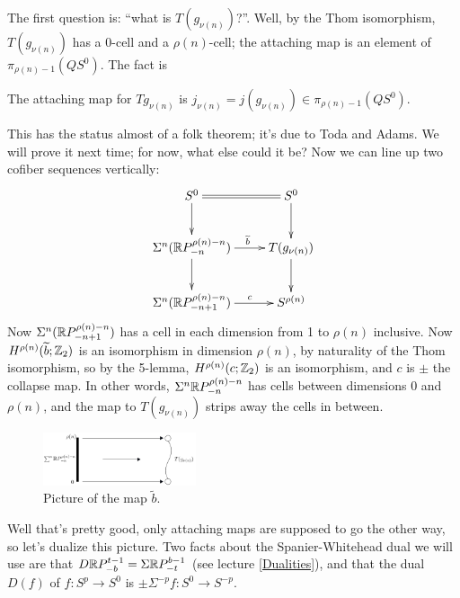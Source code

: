 The first question is: ``what is $T(g_{\nu(n)})$?''.  Well, by the Thom isomorphism, $T(g_{\nu(n)})$ has a 0-cell and a $\rho(n)$-cell; the attaching map is an element of $\pi_{\rho(n)-1} (Q S^0)$.  The fact is
\begin{thm}
The attaching map for $Tg_{\nu(n)}$ is $j_{\nu(n)} = j(g_{\nu(n)}) \in \pi_{\rho(n)-1}(QS^0)$.
\end{thm}
This has the status almost of a folk theorem; it's due to Toda and Adams.  We will prove it next time; for now, what else could it be?  Now we can line up two cofiber sequences vertically:
\[\xymatrix{S^0\ar[d]\ar@{=}[r]&S^0\ar[d]\\
\ar[d]\Suspend^n(\RP^{\rho(n)-n}_{-n}) \ar[r]^{\ \ \ \widetilde b}& T(g_{\nu(n)})\ar[d]\\
\Suspend^n (\RP^{\rho(n)-n}_{-n+1}) \ar[r]^{\ \ \ \ c} & S^{\rho(n)}
}\]
Now $\Sigma^n (\mathbb{R} P^{\rho(n)-n}_{-n+1})$ has a cell in each dimension from 1 to $\rho(n)$ inclusive. Now $H^{\rho(n)}(\widetilde b;\mathbb{Z}_2)$ is an isomorphism in dimension $\rho(n)$, by naturality of the Thom isomorphism,  so by the 5-lemma, $H^{\rho(n)}(c;\mathbb{Z}_2)$ is an isomorphism, and $c$ is $\pm$ the collapse map.
In other words, $\Sigma^n \mathbb{R} P^{\rho(n)-n}_{-n}$ has cells between dimensions $0$ and $\rho(n)$, and the map to $T(g_{\nu(n)})$ strips away the cells in between.
\begin{figure}[h!]
\centering\includegraphics[width=0.4\textwidth]{figures/figure30.pdf}
\caption{\small Picture of the map $\widetilde b$.}
\end{figure}

Well that's pretty good, only attaching maps are supposed to go the other way, so let's dualize this picture.  Two facts about the Spanier-Whitehead dual we will use are that $D \mathbb{R} P^{t-1}_{-b} = \Sigma \mathbb{R} P^{b-1}_{-t}$ (see lecture \ref{Dualities}), and that the dual $D(f)$ of $f:S^p\to S^0$ is $\pm\Sigma^{-p}f:S^0\to S^{-p}$.

